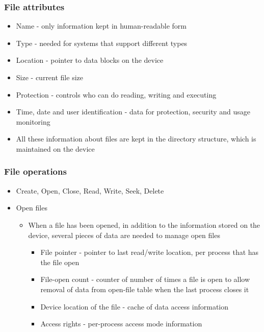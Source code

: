 \documentclass[CJKutf8,xcolor=pdftex,dvipsnames,table]{beamer}
\begin{document}
\begin{CJK*}{UTF8}{song}
  \begin{frame}
    \frametitle{File attributes} \pause
    \begin{itemize}
    \item Name \pause - only information kept in human-readable form \pause
    \item Type \pause - needed for systems that support different types \pause
    \item Location \pause - pointer to data blocks on the device \pause
    \item Size \pause - current file size \pause
    \item Protection \pause - controls who can do reading, writing and executing \pause
    \item Time, date and user identification \pause - data for protection, security and usage monitoring \pause
    \item All these information about files are kept in the directory structure, which is maintained on the device
    \end{itemize}
  \end{frame}

  \begin{frame}
    \frametitle{File operations} \pause
    \begin{itemize}
    \item Create, Open, Close, Read, Write, Seek, Delete \pause
    \item Open files \pause
      \begin{itemize}
      \item When a file has been opened, in addition to the information stored on the device, several pieces of data are needed to manage open files \pause
        \begin{itemize}
        \item File pointer \pause - pointer to last read/write location, per process that has the file open \pause
        \item File-open count \pause - counter of number of times a file is open to allow removal of data from open-file table when the last process closes it \pause
        \item Device location of the file \pause - cache of data access information \pause
        \item Access rights \pause - per-process access mode information
        \end{itemize}
      \end{itemize}
    \end{itemize}
  \end{frame}


\end{CJK*}
\end{document}
